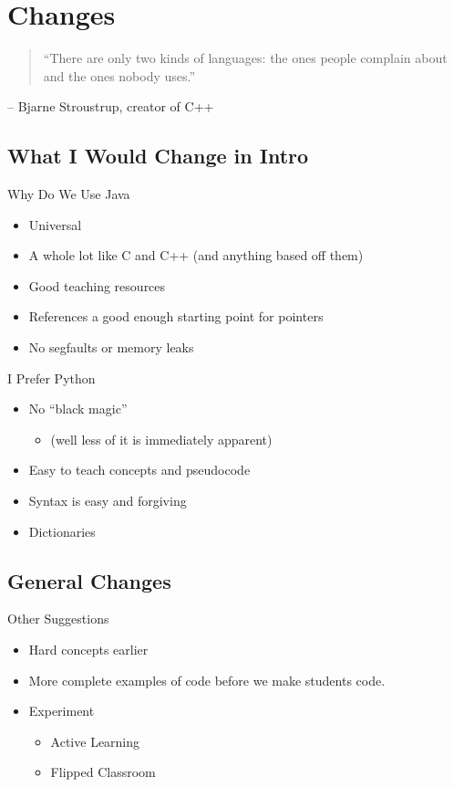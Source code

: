 \documentclass[11pt]{beamer}
\begin{document}
\section{Changes}

\begin{frame}
\begin{quotation}
	``There are only two kinds of languages: the ones people complain about and the ones nobody uses.''
\end{quotation}
-- Bjarne Stroustrup, creator of C++
\end{frame}


\subsection{What I Would Change in Intro}
\begin{frame}{Why Do We Use Java}
	\begin{itemize}
		\item Universal
		\item A whole lot like C and C++ (and anything based off them)
		\item Good teaching resources
		\item References a good enough starting point for pointers
		\item No segfaults or memory leaks
	\end{itemize}
\end{frame}

\begin{frame}{I Prefer Python}
	\begin{itemize}
		\item No ``black magic'' 
		\begin{itemize}
			\item (well less of it is immediately apparent)
		\end{itemize}
		\item Easy to teach concepts and pseudocode 
		\item Syntax is easy and forgiving
		\item Dictionaries
	\end{itemize}
\end{frame}



\subsection{General Changes}

\begin{frame}{Other Suggestions}
	\begin{itemize}
	\item Hard concepts earlier
	\item More complete examples of code before we make students code.
	\item Experiment
		\begin{itemize}
			\item Active Learning
			\item Flipped Classroom
		\end{itemize}
	\end{itemize}
		
\end{frame}
\end{document}
